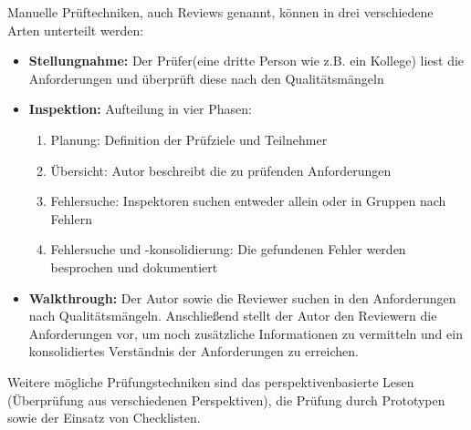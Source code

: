 Manuelle Prüftechniken, auch Reviews genannt, können in drei verschiedene Arten unterteilt werden:
\begin{itemize}
    \item \textbf{Stellungnahme:} Der Prüfer(eine dritte Person wie z.B. ein Kollege) liest die Anforderungen und überprüft diese nach den Qualitätsmängeln
    \item \textbf{Inspektion:} Aufteilung in vier Phasen:
    \begin{enumerate}
        \item Planung: Definition der Prüfziele und Teilnehmer
        \item Übersicht: Autor beschreibt die zu prüfenden Anforderungen
        \item Fehlersuche: Inspektoren suchen entweder allein oder in Gruppen nach Fehlern
        \item Fehlersuche und -konsolidierung: Die gefundenen Fehler werden besprochen und dokumentiert
    \end{enumerate}
    \item \textbf{Walkthrough:} Der Autor sowie die Reviewer suchen in den Anforderungen nach Qualitätsmängeln.
        Anschließend stellt der Autor den Reviewern die Anforderungen vor, um noch zusätzliche Informationen zu vermitteln und ein konsolidiertes Verständnis der Anforderungen zu erreichen.
\end{itemize}\autocite[vgl.][Seite 32ff]{Maulhardt.c}

Weitere mögliche Prüfungstechniken sind das perspektivenbasierte Lesen (Überprüfung aus verschiedenen Perspektiven), die Prüfung durch Prototypen sowie der Einsatz von Checklisten\autocite[vgl.][Seite 33]{Maulhardt.c}.

